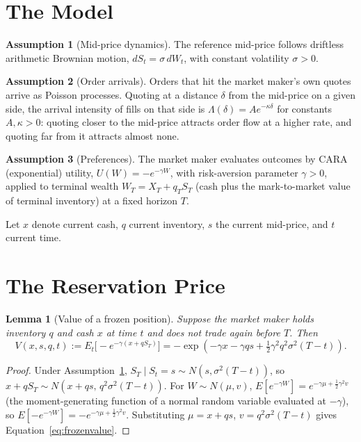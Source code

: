 \documentclass[11pt]{article}
\newtheorem{lemma}{Lemma}
\theoremstyle{remark}
\theoremstyle{definition}
\newtheorem{assumption}{Assumption}
\begin{document}
\section{The Model}
\label{sec:model}

\begin{assumption}[Mid-price dynamics]
\label{ass:price}
The reference mid-price follows driftless arithmetic Brownian motion, $dS_t = \sigma\,dW_t$, with constant volatility $\sigma>0$.
\end{assumption}

\begin{assumption}[Order arrivals]
\label{ass:arrivals}
Orders that hit the market maker's own quotes arrive as Poisson processes. Quoting at a distance $\delta$ from the mid-price on a given side, the arrival intensity of fills on that side is $\Lambda(\delta) = Ae^{-\kappa\delta}$ for constants $A,\kappa>0$: quoting closer to the mid-price attracts order flow at a higher rate, and quoting far from it attracts almost none.
\end{assumption}

\begin{assumption}[Preferences]
\label{ass:utility}
The market maker evaluates outcomes by CARA (exponential) utility, $U(W) = -e^{-\gamma W}$, with risk-aversion parameter $\gamma>0$, applied to terminal wealth $W_T = X_T + q_TS_T$ (cash plus the mark-to-market value of terminal inventory) at a fixed horizon $T$.
\end{assumption}

Let $x$ denote current cash, $q$ current inventory, $s$ the current mid-price, and $t$ current time.

\section{The Reservation Price}
\label{sec:reservation}

\begin{lemma}[Value of a frozen position]
\label{lem:frozen}
Suppose the market maker holds inventory $q$ and cash $x$ at time $t$ and does not trade again before $T$. Then
\begin{equation}
V(x,s,q,t) := E_t\big[-e^{-\gamma(x+qS_T)}\big] = -\exp\!\left(-\gamma x - \gamma qs + \tfrac12\gamma^2q^2\sigma^2(T-t)\right).
\label{eq:frozenvalue}
\end{equation}
\end{lemma}
\begin{proof}
Under Assumption~\ref{ass:price}, $S_T \mid S_t=s \sim N(s,\sigma^2(T-t))$, so $x+qS_T \sim N(x+qs,\,q^2\sigma^2(T-t))$. For $W\sim N(\mu,v)$, $E[e^{-\gamma W}] = e^{-\gamma\mu+\frac12\gamma^2v}$ (the moment-generating function of a normal random variable evaluated at $-\gamma$), so $E[-e^{-\gamma W}] = -e^{-\gamma\mu+\frac12\gamma^2v}$. Substituting $\mu=x+qs$, $v=q^2\sigma^2(T-t)$ gives Equation~\eqref{eq:frozenvalue}.
\end{proof}
\end{document}
